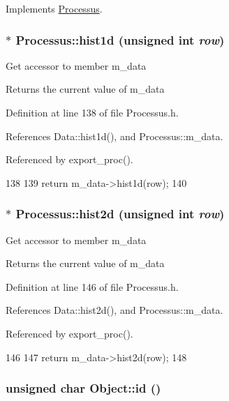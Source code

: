 Implements \hyperlink{classProcessus_aba93d691f031bdb18ae4b8afb1b2e856}{Processus}.\hypertarget{classProcessus_a409227db936baff03c0462c1bcfe8069}{
\subsubsection[{hist1d}]{$\ast$ Processus::hist1d (unsigned int {\em row})}}
\label{classProcessus_a409227db936baff03c0462c1bcfe8069}
Get accessor to member m\_\-data \begin{DoxyReturn}{Returns}
the current value of m\_\-data 
\end{DoxyReturn}


Definition at line 138 of file Processus.h.

References Data::hist1d(), and Processus::m\_\-data.

Referenced by export\_\-proc().


\begin{DoxyCode}
138                                    {
139     return m_data->hist1d(row);
140   }
\end{DoxyCode}
\hypertarget{classProcessus_a73b5118cb5f2b5eaad33286183b86cfc}{
\subsubsection[{hist2d}]{$\ast$ Processus::hist2d (unsigned int {\em row})}}
\label{classProcessus_a73b5118cb5f2b5eaad33286183b86cfc}
Get accessor to member m\_\-data \begin{DoxyReturn}{Returns}
the current value of m\_\-data 
\end{DoxyReturn}


Definition at line 146 of file Processus.h.

References Data::hist2d(), and Processus::m\_\-data.

Referenced by export\_\-proc().


\begin{DoxyCode}
146                                    {
147     return m_data->hist2d(row);
148   }
\end{DoxyCode}
\hypertarget{classObject_af99145335cc61ff6e2798ea17db009d2}{
\subsubsection[{id}]{\setlength{\rightskip}{0pt plus 5cm}unsigned char Object::id ()}}
\label{classObject_af99145335cc61ff6e2798ea17db009d2}


